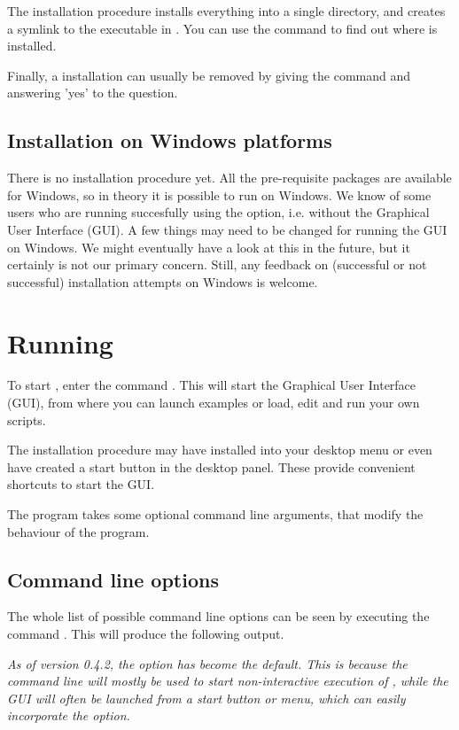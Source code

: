 The installation procedure installs everything into a single directory, and creates a symlink to the executable in .
You can use the command  to find out where \pyformex is installed. 

Finally, a \pyformex installation can usually be removed by giving the command  and answering 'yes' to the question.


\subsection{Installation on Windows platforms}
\label{sec:installation-windows}
There is no installation procedure yet. All the pre-requisite packages are available for Windows, so in theory it is possible to run \pyformex on Windows. We know of some users who are running \pyformex succesfully using the  option, i.e. without the Graphical User Interface (GUI).  
A few things may need to be changed for running the GUI on Windows. We might eventually have a look at this in the future, but it certainly is not our primary concern.
Still, any feedback on (successful or not successful) installation attempts on Windows is welcome.


\section{Running \pyf}
\label{sec:running}
To start \pyf, enter the command . This will start the \pyf Graphical User Interface (GUI), from where you can launch examples or load, edit and run your own \pyf scripts.

The installation procedure may have installed \pyf into your desktop menu or even have created a start button in the desktop panel. These provide convenient shortcuts to start the \pyf GUI.

The \pyf program takes some optional command line arguments, that modify the behaviour of the program.

\subsection{Command line options}
The whole list of possible command line options can be seen by executing the command . This will produce the following output.


\emph{As of version 0.4.2, the option has become the default. This is because the command line will mostly be used to start non-interactive execution of \pyf, while the GUI will often be launched from a start button or menu, which can easily incorporate the  option. 
}
